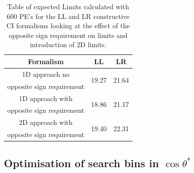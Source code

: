     \begin {table}[h]
        \begin{center}
        \begin{tabular}{ | c | c | c | } 
            \hline
            \hline
            Formalism & LL & LR \\
            \hline
            1D approach no & \multirow{2}{*}{19.27} & \multirow{2}{*}{21.64} \\
            opposite sign requirement & & \\
            1D approach with & \multirow{2}{*}{18.86} & \multirow{2}{*}{21.17} \\
            opposite sign requirement & & \\
            2D approach with & \multirow{2}{*}{19.40} & \multirow{2}{*}{22.31} \\
            opposite sign requirement & & \\
            \hline
            \hline
        \end{tabular}
        \caption{Table of expected Limits calculated with 600 PE's for the LL and LR constructive CI formalisms looking at the effect of the opposite sign requirement on limits and introduction of 2D limits.}
        \label{tab:limits_oppSign}
        \end{center}
    \end {table}



\subsection{Optimisation of search bins in $\cos{\theta^{*}}$}

